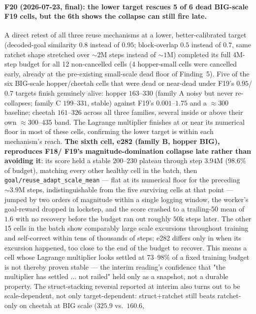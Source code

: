 \documentclass[10pt]{article}
\begin{document}
\paragraph{F20 (2026-07-23, final): the lower target rescues 5 of 6 dead
BIG-scale F19 cells, but the 6th shows the collapse can still fire late.} A
direct retest of all three reuse mechanisms at a lower, better-calibrated
target (decoded-goal similarity $0.8$ instead of $0.95$; block-overlap $0.5$
instead of $0.7$, same ratchet shape stretched over $\sim\!2$M steps instead
of $\sim\!1$M) completed its full 4M-step budget for all 12 non-cancelled
cells (4 hopper-small cells were cancelled early, already at the
pre-existing small-scale dead floor of Finding~5). Five of the six BIG-scale
hopper/cheetah cells that were dead or near-dead under F19's $0.95$/$0.7$
targets finish genuinely alive: hopper $163$--$330$ (family A noisy but
never re-collapses; family C $199$--$331$, stable) against F19's
$0.001$--$1.75$ and a $\approx 300$ baseline; cheetah $161$--$326$ across
all three families, several inside or above their own $\approx 300$--$435$
band. The Lagrange multiplier finishes at or near its numerical floor in
most of these cells, confirming the lower target is within each mechanism's
reach. \textbf{The sixth cell, e282 (family B, hopper BIG), reproduces F18/
F19's magnitude-domination collapse late rather than avoiding it}: its score
held a stable $200$--$230$ plateau through step $3.94$M ($98.6\%$ of
budget), matching every other healthy cell in the batch, then
\texttt{goal/reuse\_adapt\_scale\_mean} --- flat at its numerical floor for
the preceding $\sim\!3.9$M steps, indistinguishable from the five surviving
cells at that point --- jumped by two orders of magnitude within a single
logging window, the worker's goal-reward dropped in lockstep, and the score
crashed to a trailing-50 mean of $1.6$ with no recovery before the budget
ran out roughly $50$k steps later. The other 15 cells in the batch show
comparably large scale excursions throughout training and self-correct
within tens of thousands of steps; e282 differs only in when its excursion
happened, too close to the end of the budget to recover. This means a cell
whose Lagrange multiplier looks settled at 73--98\% of a fixed training
budget is not thereby proven stable — the interim reading's confidence that
"the multiplier has settled ... not railed" held only as a snapshot, not a
durable property. The struct-stacking reversal reported at interim also
turns out to be scale-dependent, not only target-dependent: struct$+$ratchet
still beats ratchet-only on cheetah at BIG scale ($325.9$ vs.\ $160.6$,
\end{document}
